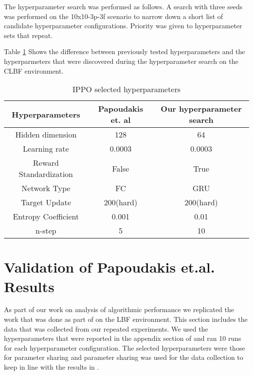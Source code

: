 \documentclass[systems,article,submit,pdftex,moreauthors]{Definitions/mdpi}
\begin{document}
The hyperparameter search was performed as follows. A search with three seeds was performed on the 10x10-3p-3f scenario to narrow down a short list of candidate hyperparameter configurations. Priority was given to hyperparameter sets that repeat. 


Table \ref{tab:Ippo hyperparameters} Shows the difference between previously tested hyperparameters and the hyperparmeters that were discovered during the hyperparameter search on the CLBF environment.


\begin{table}[!h]
\centering
\begin{tabular}{c c c}
\toprule
Hyperparameters        & Papoudakis et. al   & Our hyperparameter search  \\ \midrule
Hidden dimension       & 128               & 64 \\ 
Learning rate          & 0.0003 & 0.0003 \\ 
Reward Standardization & False           &True \\ 
Network Type           & FC               &GRU\\ 
Target Update          & 200(hard) & 200(hard) \\ 
Entropy Coefficient    & 0.001           &0.01\\ 
n-step                 & 5             &10\\ \bottomrule
\end{tabular}
\caption{IPPO selected hyperparameters}
\label{tab:Ippo hyperparameters}
\end{table}

% 


\newpage
\section{Validation of Papoudakis et.al. Results}


As part of our work on analysis of algorithmic performance we replicated the work that was done as part of \cite{DBLP:Benchmarking} on the LBF environment. This section includes the data that was collected from our repeated experiments. We used the hyperparameters that were reported in the appendix section of \cite{DBLP:Benchmarking} and ran 10 runs for each hyperparameter configuration. The selected hyperparameters were those for parameter sharing and parameter sharing was used for the data collection to keep in line with the results in \cite{DBLP:Benchmarking}. 
\end{document}
